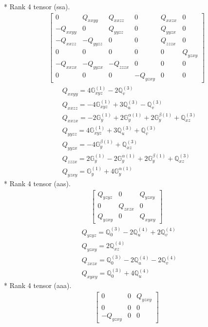 \documentclass[fleqn,8pt,landscape]{jsarticle}
\begin{document}
* Rank 4 tensor (ssa).
\begin{align*}
\begin{bmatrix} 0 & Q_{xxyy} & Q_{xxzz} & 0 & Q_{xxzx} & 0 \\ - Q_{xxyy} & 0 & Q_{yyzz} & 0 & Q_{yyzx} & 0 \\ - Q_{xxzz} & - Q_{yyzz} & 0 & 0 & Q_{zzzx} & 0 \\ 0 & 0 & 0 & 0 & 0 & Q_{yzxy} \\ - Q_{xxzx} & - Q_{yyzx} & - Q_{zzzx} & 0 & 0 & 0 \\ 0 & 0 & 0 & - Q_{yzxy} & 0 & 0 \end{bmatrix}
\end{align*}
\begin{align*}
& Q_{xxyy} = 4 \mathbb{G}_{xyz}^{(1)} - 2 \mathbb{Q}_{v}^{(3)} \\
& Q_{xxzz} = - 4 \mathbb{G}_{xyz}^{(1)} + 3 \mathbb{Q}_{u}^{(3)} - \mathbb{Q}_{v}^{(3)} \\
& Q_{xxzx} = - 2 \mathbb{G}_{y}^{(1)} + 2 \mathbb{G}_{y}^{\alpha(1)} + 2 \mathbb{G}_{y}^{\beta(1)} + \mathbb{Q}_{xz}^{(3)} \\
& Q_{yyzz} = 4 \mathbb{G}_{xyz}^{(1)} + 3 \mathbb{Q}_{u}^{(3)} + \mathbb{Q}_{v}^{(3)} \\
& Q_{yyzx} = - 4 \mathbb{G}_{y}^{\beta(1)} + \mathbb{Q}_{xz}^{(3)} \\
& Q_{zzzx} = 2 \mathbb{G}_{y}^{(1)} - 2 \mathbb{G}_{y}^{\alpha(1)} + 2 \mathbb{G}_{y}^{\beta(1)} + \mathbb{Q}_{xz}^{(3)} \\
& Q_{yzxy} = \mathbb{G}_{y}^{(1)} + 4 \mathbb{G}_{y}^{\alpha(1)}
\end{align*}
* Rank 4 tensor (aas).
\begin{align*}
\begin{bmatrix} Q_{yzyz} & 0 & Q_{yzxy} \\ 0 & Q_{zxzx} & 0 \\ Q_{yzxy} & 0 & Q_{xyxy} \end{bmatrix}
\end{align*}
\begin{align*}
& Q_{yzyz} = \mathbb{Q}_{0}^{(3)} - 2 \mathbb{Q}_{u}^{(4)} + 2 \mathbb{Q}_{v}^{(4)} \\
& Q_{yzxy} = 2 \mathbb{Q}_{xz}^{(4)} \\
& Q_{zxzx} = \mathbb{Q}_{0}^{(3)} - 2 \mathbb{Q}_{u}^{(4)} - 2 \mathbb{Q}_{v}^{(4)} \\
& Q_{xyxy} = \mathbb{Q}_{0}^{(3)} + 4 \mathbb{Q}_{u}^{(4)}
\end{align*}
* Rank 4 tensor (aaa).
\begin{align*}
\begin{bmatrix} 0 & 0 & Q_{yzxy} \\ 0 & 0 & 0 \\ - Q_{yzxy} & 0 & 0 \end{bmatrix}
\end{align*}
\end{document}
